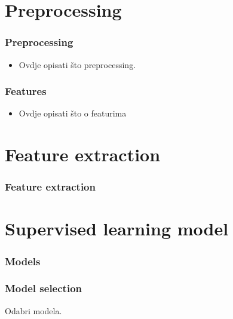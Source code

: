 \documentclass[slidestop,compress,11pt,xcolor=dvipsnames]{beamer}
\begin{document}

\section{Preprocessing}


\begin{frame}
\frametitle{Preprocessing}
\begin{itemize}
	\item Ovdje opisati što preprocessing.
\end{itemize}
\end{frame}


\begin{frame}
\frametitle{Features}
\begin{itemize}
	\item Ovdje opisati što o featurima
\end{itemize}
\end{frame}


\section{Feature extraction}


\begin{frame}
\frametitle{Feature extraction}


\end{frame}

\section{Supervised learning model}

\begin{frame}
\centering
\frametitle{Models}

\end{frame}

\begin{frame}
\frametitle{Model selection}
\centerline{Odabri modela.}
\end{frame}
\end{document}
